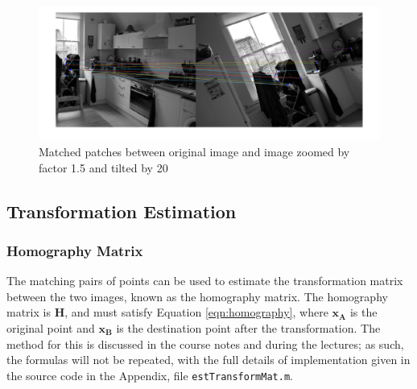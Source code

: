 \documentclass[a4paper, 10pt, conference]{ieeeconf}
\begin{document}
\begin{figure}[!ht]
  \centering
  \includegraphics[width=\linewidth]{pic/matches}
  \caption{Matched patches between original image and image zoomed by factor 1.5 and tilted by 20\degree}
  \label{fig:matched}
\end{figure}



\subsection{Transformation Estimation}

\subsubsection{Homography Matrix}
The matching pairs of points can be used to estimate the transformation matrix between the two images, known as the homography matrix. The homography matrix is \textbf{H}, and must satisfy Equation \ref{eqn:homography}, where $\textbf{x}_\textbf{A}$ is the original point and $\textbf{x}_\textbf{B}$ is the destination point after the transformation. The method for this is discussed in the course notes and during the lectures\cite{notes}; as such, the formulas will not be repeated, with the full details of implementation given in the source code in the Appendix, file \texttt{estTransformMat.m}.
\end{document}
